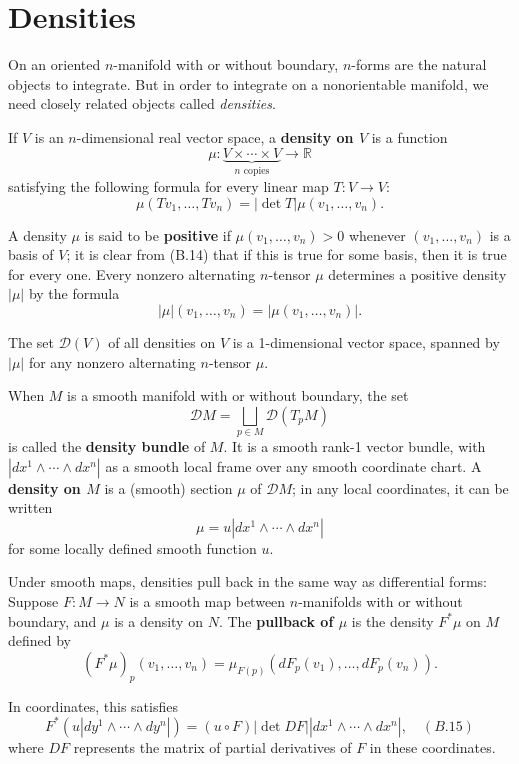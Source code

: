 \section{Densities}

On an oriented $n$-manifold with or without boundary, $n$-forms are the natural objects to integrate. But in order to integrate on a nonorientable manifold, we need closely related objects called \emph{densities}.

If $V$ is an $n$-dimensional real vector space, a \textbf{density on $V$} is a function
\[
\mu: \underbrace{V \times \cdots \times V}_{\text{$n$ copies}} \to \mathbb{R}
\]
satisfying the following formula for every linear map $T: V \to V$:
\begin{equation}
\mu(Tv_1, \ldots, Tv_n) = |\det T| \mu(v_1, \ldots, v_n). \tag{B.14}
\end{equation}

A density $\mu$ is said to be \textbf{positive} if $\mu(v_1, \ldots, v_n) > 0$ whenever $(v_1, \ldots, v_n)$ is a basis of $V$; it is clear from (B.14) that if this is true for some basis, then it is true for every one. Every nonzero alternating $n$-tensor $\mu$ determines a positive density $|\mu|$ by the formula
\[
|\mu|(v_1, \ldots, v_n) = |\mu(v_1, \ldots, v_n)|.
\]

The set $\mathcal{D}(V)$ of all densities on $V$ is a 1-dimensional vector space, spanned by $|\mu|$ for any nonzero alternating $n$-tensor $\mu$.

When $M$ is a smooth manifold with or without boundary, the set
\[
\mathcal{D}M = \bigsqcup_{p \in M} \mathcal{D}(T_p M)
\]
is called the \textbf{density bundle} of $M$. It is a smooth rank-1 vector bundle, with $|dx^1 \wedge \cdots \wedge dx^n|$ as a smooth local frame over any smooth coordinate chart. A \textbf{density on $M$} is a (smooth) section $\mu$ of $\mathcal{D}M$; in any local coordinates, it can be written
\[
\mu = u |dx^1 \wedge \cdots \wedge dx^n|
\]
for some locally defined smooth function $u$.

Under smooth maps, densities pull back in the same way as differential forms: Suppose $F: M \to N$ is a smooth map between $n$-manifolds with or without boundary, and $\mu$ is a density on $N$. The \textbf{pullback of $\mu$} is the density $F^*\mu$ on $M$ defined by
\[
(F^*\mu)_p(v_1, \ldots, v_n) = \mu_{F(p)}(dF_p(v_1), \ldots, dF_p(v_n)).
\]

In coordinates, this satisfies
\[
F^*(u |dy^1 \wedge \cdots \wedge dy^n|) = (u \circ F)|\det DF| |dx^1 \wedge \cdots \wedge dx^n|,
\quad (B.15)
\]
where $DF$ represents the matrix of partial derivatives of $F$ in these coordinates.

